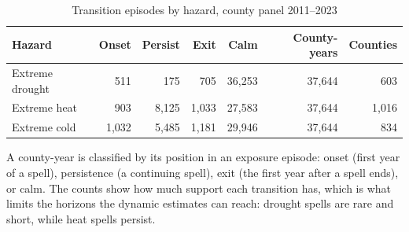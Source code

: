 \begin{table}[htbp]
\centering
\footnotesize
\setlength{\tabcolsep}{4pt}
\sloppy
\caption{Transition episodes by hazard, county panel 2011--2023}
\label{tab:e2t1}
\begin{tabularx}{\textwidth}{>{\raggedright\arraybackslash}X r r r r r r}
\toprule
Hazard & Onset & Persist & Exit & Calm & County-years & Counties \\
\midrule
Extreme drought & 511 & 175 & 705 & 36,253 & 37,644 & 603 \\
Extreme heat & 903 & 8,125 & 1,033 & 27,583 & 37,644 & 1,016 \\
Extreme cold & 1,032 & 5,485 & 1,181 & 29,946 & 37,644 & 834 \\
\bottomrule
\end{tabularx}
\begin{minipage}{\textwidth}\vspace{0.5em}\footnotesize
A county-year is classified by its position in an exposure episode: onset (first year of a spell), persistence (a continuing spell), exit (the first year after a spell ends), or calm. The counts show how much support each transition has, which is what limits the horizons the dynamic estimates can reach: drought spells are rare and short, while heat spells persist.
\end{minipage}
\end{table}
